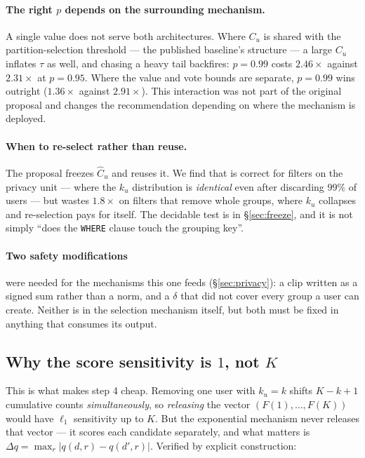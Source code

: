 \documentclass[11pt,a4paper]{article}
\newcommand{\Cu}{C_u}
\newcommand{\ku}{k_u}
\begin{document}
\paragraph{The right $p$ depends on the surrounding mechanism.} A single value does not serve both
architectures. Where $\Cu$ is shared with the partition-selection threshold --- the published
baseline's structure --- a large $\Cu$ inflates $\tau$ as well, and chasing a heavy tail backfires:
$p = 0.99$ costs $2.46\times$ against $2.31\times$ at $p = 0.95$. Where the value and vote bounds
are separate, $p = 0.99$ wins outright ($1.36\times$ against $2.91\times$). This interaction was not
part of the original proposal and changes the recommendation depending on where the mechanism is
deployed.

\paragraph{When to re-select rather than reuse.} The proposal freezes $\hat\Cu$ and reuses it. We
find that is correct for filters on the privacy unit --- where the $\ku$ distribution is
\emph{identical} even after discarding $99\%$ of users --- but wastes $1.8\times$ on filters that
remove whole groups, where $\ku$ collapses and re-selection pays for itself. The decidable test is
in \S\ref{sec:freeze}, and it is not simply ``does the \texttt{WHERE} clause touch the grouping
key''.

\paragraph{Two safety modifications} were needed for the mechanisms this one feeds
(\S\ref{sec:privacy}): a clip written as a signed sum rather than a norm, and a $\delta$ that did
not cover every group a user can create. Neither is in the selection mechanism itself, but both
must be fixed in anything that consumes its output.

\subsection{Why the score sensitivity is $1$, not $K$}

This is what makes step 4 cheap. Removing one user with $\ku = k$ shifts $K-k+1$ cumulative counts
\emph{simultaneously}, so \emph{releasing} the vector $(F(1),\dots,F(K))$ would have $\ell_1$
sensitivity up to $K$. But the exponential mechanism never releases that vector --- it scores each
candidate separately, and what matters is $\Delta q = \max_r |q(d,r) - q(d',r)|$. Verified by
explicit construction:
\end{document}
